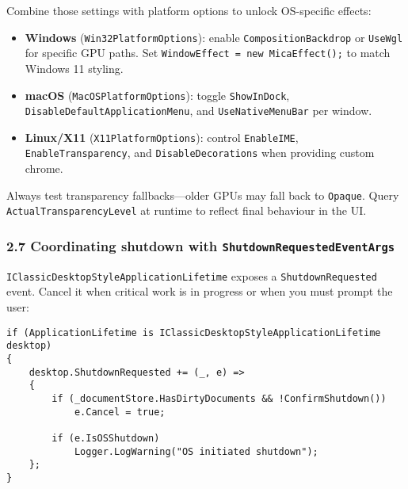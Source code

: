 Combine those settings with platform options to unlock OS-specific
effects:

\begin{itemize}
\tightlist
\item
  \textbf{Windows} (\passthrough{\lstinline!Win32PlatformOptions!}):
  enable \passthrough{\lstinline!CompositionBackdrop!} or
  \passthrough{\lstinline!UseWgl!} for specific GPU paths. Set
  \passthrough{\lstinline!WindowEffect = new MicaEffect();!} to match
  Windows 11 styling.
\item
  \textbf{macOS} (\passthrough{\lstinline!MacOSPlatformOptions!}):
  toggle \passthrough{\lstinline!ShowInDock!},
  \passthrough{\lstinline!DisableDefaultApplicationMenu!}, and
  \passthrough{\lstinline!UseNativeMenuBar!} per window.
\item
  \textbf{Linux/X11} (\passthrough{\lstinline!X11PlatformOptions!}):
  control \passthrough{\lstinline!EnableIME!},
  \passthrough{\lstinline!EnableTransparency!}, and
  \passthrough{\lstinline!DisableDecorations!} when providing custom
  chrome.
\end{itemize}

Always test transparency fallbacks---older GPUs may fall back to
\passthrough{\lstinline!Opaque!}. Query
\passthrough{\lstinline!ActualTransparencyLevel!} at runtime to reflect
final behaviour in the UI.

\subsubsection{\texorpdfstring{2.7 Coordinating shutdown with
\texttt{ShutdownRequestedEventArgs}}{2.7 Coordinating shutdown with ShutdownRequestedEventArgs}}\label{coordinating-shutdown-with-shutdownrequestedeventargs}

\passthrough{\lstinline!IClassicDesktopStyleApplicationLifetime!}
exposes a \passthrough{\lstinline!ShutdownRequested!} event. Cancel it
when critical work is in progress or when you must prompt the user:

\begin{lstlisting}
if (ApplicationLifetime is IClassicDesktopStyleApplicationLifetime desktop)
{
    desktop.ShutdownRequested += (_, e) =>
    {
        if (_documentStore.HasDirtyDocuments && !ConfirmShutdown())
            e.Cancel = true;

        if (e.IsOSShutdown)
            Logger.LogWarning("OS initiated shutdown");
    };
}
\end{lstlisting}

